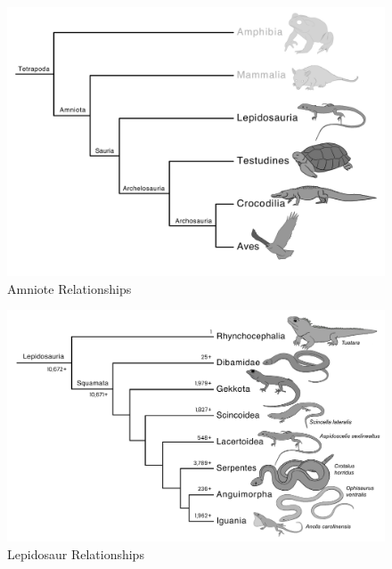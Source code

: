 \documentclass[a4paper,12pt]{article}
\begin{document}
%
%

\pagestyle{fancyplain}
\fancyhf{}
\thispagestyle{plain}

\begin{figure}[H]
\centering
  \includegraphics[scale=0.3]{Amniota_tre.pdf}
  \caption{Amniote Relationships}
  \label{fig:Amniota}
\end{figure}

\begin{figure}[H]
\centering
  \includegraphics[scale=0.3]{Lepidosauria_tre.pdf}
  \caption{Lepidosaur Relationships}
  \label{fig:Lepidosauria}
\end{figure}
\end{document}
